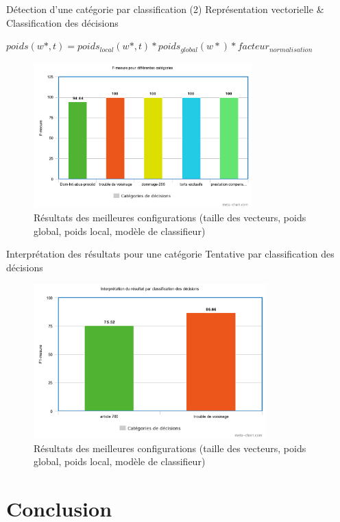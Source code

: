 \documentclass[newPxFont,pagenumber]{beamer}
\begin{document}
\begin{frame}{Détection d'une catégorie par classification}
(2) Représentation vectorielle \& Classification des décisions

{\small $ poids(w*, t) = poids_{local}(w*, t) * poids_{global}(w*) * facteur_{normalisation}$}

\begin{figure}
\includegraphics[width=0.75\textwidth]{f-mesure-classif.png}
\caption{Résultats des meilleures configurations (taille des vecteurs, poids global, poids local, modèle de classifieur)}
\end{figure}
\end{frame}

\begin{frame}{Interprétation des résultats pour une catégorie}
Tentative par classification des décisions
\begin{figure}
\includegraphics[width=0.8\textwidth]{classifResultat.png}
\caption{Résultats des meilleures configurations (taille des vecteurs, poids global, poids local, modèle de classifieur)}
\end{figure}
\end{frame}

\section{Conclusion}
\end{document}
